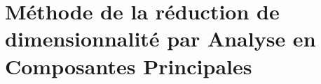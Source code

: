 \section{Méthode de la réduction
de dimensionnalité par Analyse
en Composantes Principales}


\clearpage


\clearpage


\clearpage
